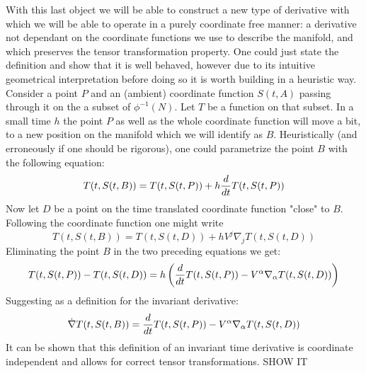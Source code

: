 \documentclass[../main.tex]{subfiles}
\begin{document}
        With this last object we will be able to construct a new type of derivative with which we will be able to operate in a purely coordinate free manner: a derivative not dependant on the coordinate functions we use to describe the manifold, and which preserves the tensor transformation property. One could just state the definition and show that it is well behaved, however due to its intuitive geometrical interpretation before doing so it is worth building in a heuristic way. Consider a point $P$ and an (ambient) coordinate function $S(t,A)$ passing through it on the a subset of $\phi^{-1}(N)$. Let $T$ be a function on that subset. In a small time $h$ the point $P$ as well as the whole coordinate function will move a bit, to a new position on the manifold which we will identify as $B$. Heuristically (and erroneously if one should be rigorous), one could parametrize the point $B$ with the following equation:
        \begin{equation}
            T(t,S(t,B))=T(t,S(t,P))+h\dfrac{d}{dt}T(t,S(t,P))
        \end{equation}
        Now let $D$ be a point on the time translated coordinate function "close" to $B$. Following the coordinate function one might write
        \begin{equation}
            T(t,S(t,B))=T(t,S(t,D))+hV^j\nabla_jT(t,S(t,D))
        \end{equation}
        Eliminating the point $B$ in the two preceding equations we get:
        \begin{equation}
            T(t,S(t,P))-T(t,S(t,D))=h\left(\dfrac{d}{dt}T(t,S(t,P))-V^\alpha\nabla_\alpha T(t,S(t,D))\right)
        \end{equation}
        Suggesting as a definition for the invariant derivative:
        \begin{equation}
            \dot{\nabla}T(t,S(t,B))=\dfrac{d}{dt}T(t,S(t,P))-V^\alpha\nabla_\alpha T(t,S(t,D))
        \end{equation}
        It can be shown that this definition of an invariant time derivative is coordinate independent and allows for correct tensor transformations. SHOW IT
        
\end{document}
